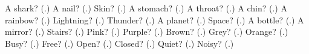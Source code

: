 \begin{tcolorbox}[breakable,colback=teal!4,colframe=teal!35!black,title={Before you move on}]
A shark? (\textbf{}.) A nail? (\textbf{}.) Skin? (\textbf{}.) A stomach? (\textbf{}.) A throat? (\textbf{}.) A chin? (\textbf{}.) A rainbow? (\textbf{}.) Lightning? (\textbf{}.) Thunder? (\textbf{}.) A planet? (\textbf{}.) Space? (\textbf{}.) A bottle? (\textbf{}.) A mirror? (\textbf{}.) Stairs? (\textbf{}.) Pink? (\textbf{}.) Purple? (\textbf{}.) Brown? (\textbf{}.) Grey? (\textbf{}.) Orange? (\textbf{}.) Busy? (\textbf{}.) Free? (\textbf{}.) Open? (\textbf{}.) Closed? (\textbf{}.) Quiet? (\textbf{}.) Noisy? (\textbf{}.)
\end{tcolorbox}
